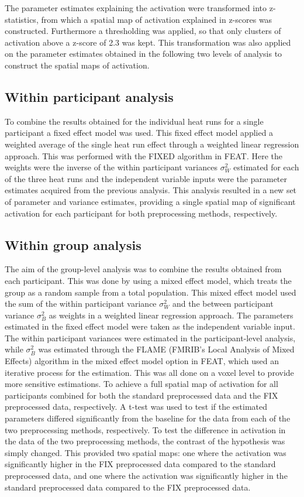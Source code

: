 The parameter estimates explaining the activation were transformed into z-statistics, from which a spatial map of activation explained in z-scores was constructed. Furthermore a thresholding was applied, so that only clusters of activation above a z-score of 2.3 was kept. This transformation was also applied on the parameter estimates obtained in the following two levels of analysis to construct the spatial maps of activation. 

\subsection{Within participant analysis}
To combine the results obtained for the individual heat runs for a single participant a fixed effect model was used. This fixed effect model applied a weighted average of the single heat run effect through a weighted linear regression approach. This was performed with the FIXED algorithm in FEAT. Here the weights were the inverse of the within participant variances $\sigma_{W}^{2}$ estimated for each of the three heat runs and the independent variable inputs were the parameter estimates acquired from the previous analysis. This analysis resulted in a new set of parameter and variance estimates, providing a single spatial map of significant activation for each participant for both preprocessing methods, respectively.

\subsection{Within group analysis}
The aim of the group-level analysis was to combine the results obtained from each participant. This was done by using a mixed effect model, which treats the group as a random sample from a total population. This mixed effect model used the sum of the within participant variance $\sigma_{W}^{2}$ and the between participant variance $\sigma_{B}^{2}$ as weights in a weighted linear regression approach. The parameters estimated in the fixed effect model were taken as the independent variable input. The within participant variances were estimated in the participant-level analysis, while $\sigma_{B}^{2}$ was estimated through the FLAME (FMRIB's Local Analysis of Mixed Effects) algorithm in the mixed effect model option in FEAT, which used an iterative process for the estimation. This was all done on a voxel level to provide more sensitive estimations.
To achieve a full spatial map of activation for all participants combined for both the standard preprocessed data and the FIX preprocessed data, respectively. A t-test was used to test if the estimated parameters differed significantly from the baseline for the data from each of the two preprocessing methods, respectively. 
To test the difference in activation in the data of the two preprocessing methods, the contrast of the hypothesis was simply changed. This provided two spatial maps: one where the activation was significantly higher in the FIX preprocessed data compared to the standard preprocessed data, and one where the activation was significantly higher in the standard preprocessed data compared to the FIX preprocessed data.

